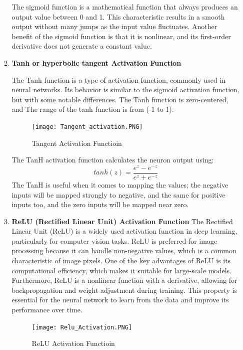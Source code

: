 \begin{itemize}
\begin{enumerate}
    The sigmoid function is a mathematical function that always produces an output value between 0 and 1. This characteristic results in a smooth output without many jumps as the input value fluctuates. Another benefit of the sigmoid function is that it is nonlinear, and its first-order derivative does not generate a constant value.
    \item \textbf{Tanh or hyperbolic tangent Activation Function}
    
    The Tanh function is a type of activation function, commonly used in neural networks. Its behavior is similar to the sigmoid activation function, but with some notable differences. The Tanh function is zero-centered, and The range of the tanh function is from (-1 to 1).
    
    \begin{figure}[H]
        \centering\texttt{[image: Tangent\_activation.PNG]}
        \caption{Tangent Activation Functioin}
    \end{figure}
    
    The TanH activation function calculates the neuron output using:\\
    $$tanh(z)=\frac{e^{z}-e^{-z}}{e^{z}+e^{-z}}$$
    The TanH is useful when it comes to mapping the values; the negative inputs will be mapped strongly to negative, and the same for positive inputs too, and the zero inputs will be mapped near zero.
    \item \textbf{ReLU (Rectified Linear Unit) Activation Function}
   The Rectified Linear Unit (ReLU) is a widely used activation function in deep learning, particularly for computer vision tasks. ReLU is preferred for image processing because it can handle non-negative values, which is a common characteristic of image pixels. One of the key advantages of ReLU is its computational efficiency, which makes it suitable for large-scale models. Furthermore, ReLU is a nonlinear function with a derivative, allowing for backpropagation and weight adjustment during training. This property is essential for the neural network to learn from the data and improve its performance over time.
    
    \begin{figure}[H]
        \centering\texttt{[image: Relu\_Activation.PNG]}
        \caption{ReLU Activation Functioin}
    \end{figure}
    

\end{enumerate}
\end{itemize}
